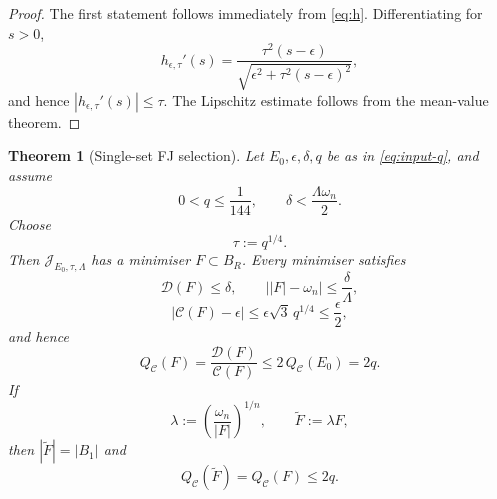 \documentclass[11pt]{amsart}
\newtheorem{theorem}{Theorem}[section]
\theoremstyle{definition}
\newcommand{\Def}{\mathcal D}
\begin{document}
\begin{proof}
The first statement follows immediately from \eqref{eq:h}.  Differentiating
for \(s>0\),
\[
   h_{\epsilon,\tau}'(s)
   =
   \frac{\tau^2(s-\epsilon)}
        {\sqrt{\epsilon^2+\tau^2(s-\epsilon)^2}},
\]
and hence \(|h_{\epsilon,\tau}'(s)|\le\tau\).  The Lipschitz estimate
follows from the mean-value theorem.
\end{proof}

\begin{theorem}[Single-set FJ selection]\label{thm:FJ-selection}
Let \(E_0,\epsilon,\delta,q\) be as in \eqref{eq:input-q}, and assume
\[
   0<q\le\frac1{144},\qquad
   \delta<\frac{\Lambda\omega_n}{2}.
\tag{4.17}\label{eq:q-select-small}
\]
Choose
\[
   \tau:=q^{1/4}.
\tag{4.18}\label{eq:tau}
\]
Then \(\mathcal J_{E_0,\tau,\Lambda}\) has a minimiser \(F\subset B_R\).
Every minimiser satisfies
\[
   \Def(F)\le\delta,\qquad
   \bigl||F|-\omega_n\bigr|\le\frac{\delta}{\Lambda},
\tag{4.19}\label{eq:selected-def-volume}
\]
\[
   |\mathcal C(F)-\epsilon|
   \le\epsilon\sqrt3\,q^{1/4}
   \le\frac{\epsilon}{2},
\tag{4.20}\label{eq:selected-C}
\]
and hence
\[
   Q_{\mathcal C}(F)
   =\frac{\Def(F)}{\mathcal C(F)}
   \le2\,Q_{\mathcal C}(E_0)=2q.
\tag{4.21}\label{eq:selected-ratio}
\]
If
\[
   \lambda:=\left(\frac{\omega_n}{|F|}\right)^{1/n},
   \qquad \widetilde F:=\lambda F,
\tag{4.22}\label{eq:F-normalise}
\]
then \(|\widetilde F|=|B_1|\) and
\[
   Q_{\mathcal C}(\widetilde F)=Q_{\mathcal C}(F)\le2q.
\tag{4.23}\label{eq:selected-normal-ratio}
\]
\end{theorem}
\end{document}
